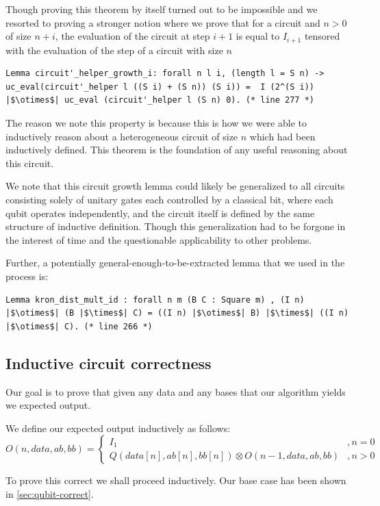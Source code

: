 \documentclass{article}
\begin{document}
Though proving this theorem by itself turned out to be impossible and we resorted to proving a stronger notion where we prove that for a circuit and $n>0$ of size $n+i$, the evaluation of the circuit at step $i+1$ is equal to $I_{i+1}$ tensored with the evaluation of the  step of a circuit with size $n$
\begin{verbatim}
Lemma circuit'_helper_growth_i: forall n l i, (length l = S n) -> uc_eval(circuit'_helper l ((S i) + (S n)) (S i)) =  I (2^(S i)) |$\otimes$| uc_eval (circuit'_helper l (S n) 0). (* line 277 *)
\end{verbatim}

The reason we note this property is because this is how we were able to inductively reason about a heterogeneous circuit of size $n$ which had been inductively defined.
This theorem is the foundation of any useful reasoning about this circuit.

We note that this circuit growth lemma could likely be generalized to all circuits consisting solely of unitary gates each controlled by a classical bit, where each qubit operates independently, and the circuit itself is defined by the same structure of inductive definition. 
Though this generalization had to be forgone in the interest of time and the questionable applicability to other problems.

Further, a potentially general-enough-to-be-extracted lemma that we used in the process is:
\begin{verbatim}
Lemma kron_dist_mult_id : forall n m (B C : Square m) , (I n) |$\otimes$| (B |$\times$| C) = ((I n) |$\otimes$| B) |$\times$| ((I n) |$\otimes$| C). (* line 266 *)
\end{verbatim}
\subsection{Inductive circuit correctness}\label{sec:circuit-correct}
Our goal is to prove that given any data and any bases that our algorithm yields we expected output.

We define our expected output inductively as follows:
$$O(n,data,ab,bb) = \begin{cases}I_1&,n=0\\ Q(data[n],ab[n],bb[n]) \otimes O(n-1, data, ab,bb)&, n>0\end{cases}$$

To prove this correct we shall proceed inductively. Our base case has been shown in \cref{sec:qubit-correct}.
\end{document}
